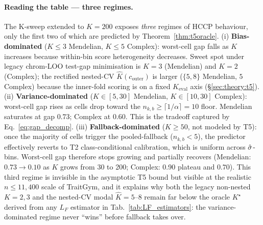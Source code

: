 \paragraph{Reading the table --- three regimes.} The K-sweep extended to $K = 200$ exposes \emph{three} regimes of HCCP behaviour, only the first two of which are predicted by Theorem~\ref{thm:t5oracle}.
(i) \textbf{Bias-dominated} ($K \leq 3$ Mendelian, $K \leq 5$ Complex): worst-cell gap falls as $K$ increases because within-bin score heterogeneity decreases. Sweet spot under legacy chrom-LOO test-gap minimisation is $K{=}3$ (Mendelian) and $K{=}2$ (Complex); the rectified nested-CV $\hat K(c_{\mathrm{outer}})$ is larger ($\{5, 8\}$ Mendelian, $5$ Complex) because the inner-fold scoring is on a fixed $K_{\mathrm{eval}}$ axis (§\ref{sec:theory:t5}).
(ii) \textbf{Variance-dominated} ($K \in [5, 30]$ Mendelian, $K \in [10, 30]$ Complex): worst-cell gap rises as cells drop toward the $n_{k,b} \geq \lceil 1/\alpha\rceil = 10$ floor. Mendelian saturates at gap $0.73$; Complex at $0.60$. This is the tradeoff captured by Eq.~\ref{eq:gap_decomp}.
(iii) \textbf{Fallback-dominated} ($K \geq 50$, not modeled by T5): once the majority of cells trigger the pooled-fallback ($n_{k,b} < 5$), the predictor effectively reverts to T2 class-conditional calibration, which is uniform across $\hat{\sigma}$-bins. Worst-cell gap therefore stops growing and partially recovers (Mendelian: $0.73 \to 0.10$ as $K$ grows from 30 to 200; Complex: 0.90 plateau and $0.70$). This third regime is invisible in the asymptotic T5 bound but visible at the realistic $n \leq 11{,}400$ scale of TraitGym, and it explains why both the legacy non-nested $K = 2,3$ and the nested-CV modal $\hat K = 5\text{--}8$ remain far below the oracle $K^\star$ derived from any $L_F$ estimator in Tab.~\ref{tab:LF_estimators}: the variance-dominated regime never ``wins'' before fallback takes over.

